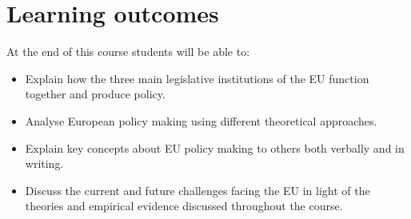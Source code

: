 
\section*{Learning outcomes}

At the end of this course students will be able to:

\begin{itemize}
	\item Explain how the three main legislative institutions of the EU function together and produce policy.
	\item Analyse European policy making using different theoretical approaches.
	\item Explain key concepts about EU policy making to others both verbally and in writing.
	\item Discuss the current and future challenges facing the EU in light of the theories and empirical evidence discussed throughout the course.
\end{itemize}